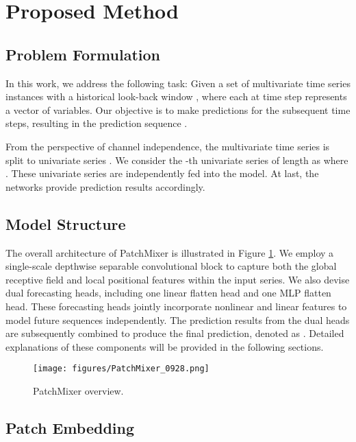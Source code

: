 \documentclass{article} \usepackage{iclr2024_conference,times}
\begin{document}
\section{Proposed Method}

\subsection{Problem Formulation}

In this work, we address the following task: Given a set of multivariate time series instances with a historical look-back window , where each  at time step  represents a vector of  variables. Our objective is to make predictions for the subsequent  time steps, resulting in the prediction sequence .

From the perspective of channel independence, the multivariate time series  is split to  univariate series . We consider the -th univariate series of length  as  where . These univariate series are independently fed into the model. At last, the networks provide prediction results  accordingly.

\subsection{Model Structure}

The overall architecture of PatchMixer is illustrated in Figure \ref{fig::model_overview}. We employ a single-scale depthwise separable convolutional block to capture both the global receptive field and local positional features within the input series. We also devise dual forecasting heads, including one linear flatten head and one MLP flatten head. These forecasting heads jointly incorporate nonlinear and linear features to model future sequences independently. The prediction results from the dual heads are subsequently combined to produce the final prediction, denoted as . Detailed explanations of these components will be provided in the following sections.

\begin{figure}[h]
\begin{center}
\texttt{[image: figures/PatchMixer\_0928.png]}
\end{center}
\caption{PatchMixer overview.}
\label{fig::model_overview}
\end{figure}

\subsection{Patch Embedding}
\end{document}
